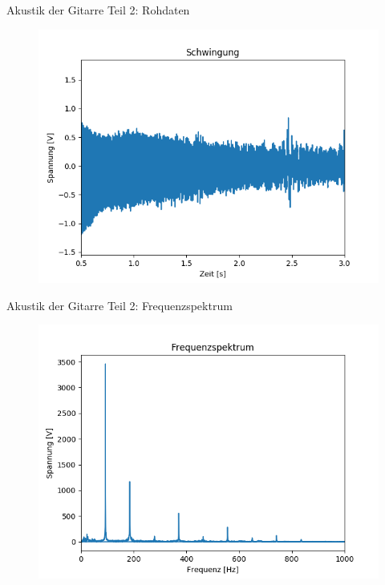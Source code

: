 \documentclass[12pt]{beamer}
\begin{document}
\begin{frame}{Akustik der Gitarre Teil 2: Rohdaten}
	\begin{figure}
		\includegraphics[scale=0.6]{Bilder/Gitarre_Schwingung.PNG}
	\end{figure}
\end{frame}

\begin{frame}{Akustik der Gitarre Teil 2: Frequenzspektrum}
	\begin{figure}
		\includegraphics[scale=0.6]{Bilder/FrequenzspektrumGitarrensaite.PNG}
	\end{figure}
\end{frame}
\end{document}

